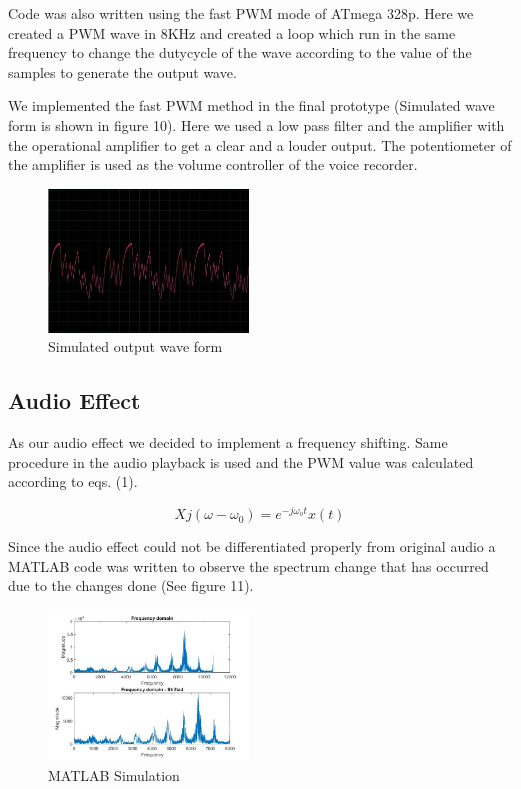 \documentclass[11pt]{article}
\begin{document}
Code was also written using the fast PWM mode of ATmega 328p. Here we created a PWM wave in 8KHz and created a loop which run in the same frequency to change the dutycycle of the wave according to the value of the samples to generate the output wave.

We implemented the fast PWM method in the final prototype (Simulated wave form is shown in figure 10). Here we used a low pass filter and the amplifier with the operational amplifier to get a clear and a louder output. The potentiometer of the amplifier is used as the volume controller of the voice recorder.

\begin{figure}
    \centering
    \includegraphics[width=0.475\textwidth]{Images/output.jpg}
    \caption{Simulated output wave form}
\end{figure}


\subsection{Audio Effect}
As our audio effect we decided to implement a frequency shifting. Same procedure in the audio playback is used and the PWM value was calculated according to eqs. (1).

\begin{equation}
    Xj(\omega-\omega_0) = e^{-j\omega_ot}x(t)
\end{equation}

Since the audio effect could not be differentiated properly from original audio a MATLAB code was written to observe the spectrum change that has occurred due to the changes done (See figure 11). 
\begin{figure}
    \centering
    \includegraphics[width=0.475\textwidth]{Images/matlab.jpg}
    \caption{MATLAB Simulation}
\end{figure}
\end{document}
